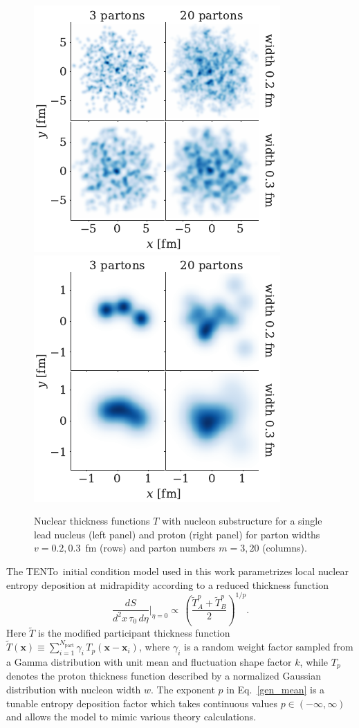 \documentclass[3p,times,procedia]{elsarticle}
\newcommand{\trento}{T\raisebox{-0.3ex}{R}ENTo}
\newcommand{\T}{\tilde{T}}
\begin{document}
\begin{figure}
  \centering
  \includegraphics{Pb_thickness} 
  \hspace{8ex}
  \includegraphics{p_thickness}
  \caption{\label{fig:substructure}
    Nuclear thickness functions $T$ with nucleon substructure for a single lead nucleus (left panel) and proton (right panel) for parton widths $v= 0.2, 0.3$~fm (rows) and parton numbers $m=3,20$ (columns).
  }
\end{figure}

The \trento\ initial condition model used in this work parametrizes local nuclear entropy deposition at midrapidity according to a reduced thickness function
\begin{equation}
  \label{gen_mean}
  \frac{dS}{d^2x\, \tau_0\, d\eta} \bigg\vert_{\eta=0} \propto\, \left(\frac{\T_A^p + \T_B^p}{2}\right)^{1/p}.
\end{equation}
Here $\T$ is the modified participant thickness function $\T(\mathbf{x}) \equiv \sum_{i=1}^{N_\mathrm{part}} \gamma_i\, T_p(\mathbf{x} - \mathbf{x}_i)$, where $\gamma_i$ is a random weight factor sampled from a Gamma distribution with unit mean and fluctuation shape factor $k$, while $T_p$ denotes the proton thickness function described by a normalized Gaussian distribution with nucleon width $w$. 
The exponent $p$ in Eq.~\eqref{gen_mean} is a tunable entropy deposition factor which takes continuous values $p \in (-\infty, \infty)$ and allows the model to mimic various theory calculations. 
\end{document}

